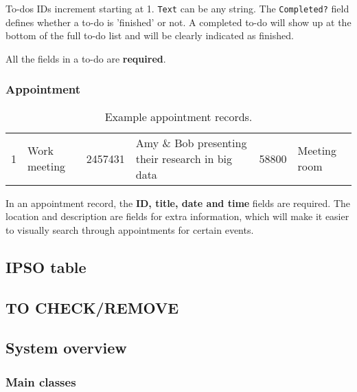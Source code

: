 To-dos IDs increment starting at 1. \texttt{Text} can be any string. The
\texttt{Completed?} field defines whether a to-do is 'finished' or not. A
completed to-do will show up at the bottom of the full to-do list and will
be clearly indicated as finished.

All the fields in a to-do are \textbf{required}.


\subsubsection{Appointment}

\begin{table}[H]
    \centering
    \begin{tabulary}{\linewidth}{|L|L|L|L|L|L|} \hline
         &
         &
         &
         &
         &
         \\  & Work meeting & 2457431 &
            Amy \& Bob presenting their research in big data &
            58800 & Meeting room \R
    \end{tabulary}
    \caption{Example appointment records.}
    \label{tbl:todo-appt}
\end{table}

In an appointment record, the \textbf{ID, title, date and time} fields are
required. The location and description are fields for extra information, which
will make it easier to visually search through appointments for certain events.


\subsection{IPSO table}



\subsection{TO CHECK/REMOVE}
\subsection{System overview}
\subsubsection{Main classes}

\newcommand{\classitem}[1]{\item \textbf{#1}}

